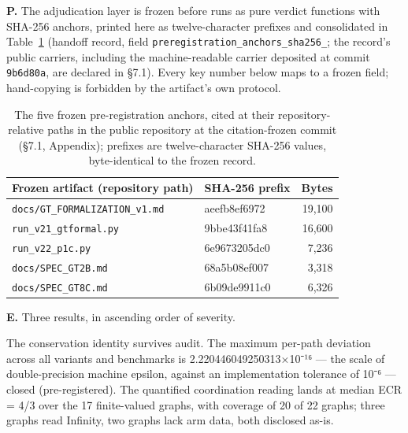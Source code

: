 \documentclass[11pt,a4paper]{article}
\begin{document}
\textbf{P.} The adjudication layer is frozen before runs as pure verdict functions with SHA-256 anchors, printed here as twelve-character prefixes and consolidated in Table~\ref{tab:anchors} (handoff record, field \texttt{preregistration\_\allowbreak anchors\_\allowbreak sha256\_}; the record's public carriers, including the machine-readable carrier deposited at commit \texttt{9b6d80a}, are declared in §7.1). Every key number below maps to a frozen field; hand-copying is forbidden by the artifact's own protocol.

\begin{table}[htbp]
\centering
\small
\setlength{\tabcolsep}{5pt}
\renewcommand{\arraystretch}{1.18}
\begin{tabularx}{0.94\textwidth}{@{}>{\raggedright\arraybackslash}X l r@{}}
\toprule
\textbf{Frozen artifact (repository path)} & \textbf{SHA-256 prefix} & \textbf{Bytes} \\
\midrule
\texttt{docs/\allowbreak GT\_\allowbreak FORMALIZATION\_\allowbreak v1.md} & aeefb8ef6972 & 19,100 \\
\texttt{run\_\allowbreak v21\_\allowbreak gtformal.py} & 9bbe43f41fa8 & 16,600 \\
\texttt{run\_\allowbreak v22\_\allowbreak p1c.py} & 6e9673205dc0 & 7,236 \\
\texttt{docs/\allowbreak SPEC\_\allowbreak GT2B.md} & 68a5b08ef007 & 3,318 \\
\texttt{docs/\allowbreak SPEC\_\allowbreak GT8C.md} & 6b09de9911c0 & 6,326 \\
\bottomrule
\end{tabularx}
\caption{The five frozen pre-registration anchors, cited at their repository-relative paths in the public repository at the citation-frozen commit (§7.1, Appendix); prefixes are twelve-character SHA-256 values, byte-identical to the frozen record.}
\label{tab:anchors}
\end{table}

\textbf{E.} Three results, in ascending order of severity.

The conservation identity survives audit. The maximum per-path deviation across all variants and benchmarks is 2.220446049250313×10⁻¹⁶ — the scale of double-precision machine epsilon, against an implementation tolerance of 10⁻⁶ — closed (pre-registered). The quantified coordination reading lands at median ECR = 4/3 over the 17 finite-valued graphs, with coverage of 20 of 22 graphs; three graphs read Infinity, two graphs lack arm data, both disclosed as-is.
\end{document}
